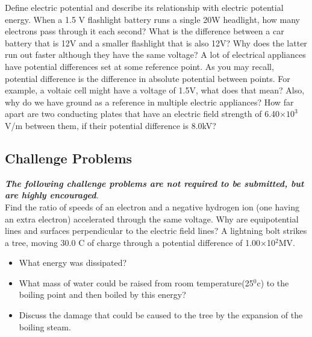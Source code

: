 \documentclass[9pt,addpoints]{exam}
\begin{document}
	\begin{questions}
		\question Define electric potential and describe its relationship with electric potential energy.
		\question When a 1.5 V flashlight battery runs a single 20W headlight, how many electrons pass through it each second?
		\question What is the difference between a car battery that is 12V and a smaller flashlight that is also 12V? Why does the latter run out faster although they have the same voltage?
		\question A lot of electrical appliances have potential differences set at some reference point. As you may recall, potential difference is the difference in absolute potential between points. For example, a voltaic cell might have a voltage of 1.5V, what does that mean? Also, why do we have ground as a reference in multiple electric appliances?
		\question How far apart are two conducting plates that have an electric field strength of  6.40×$10^3$V/m  between them, if their potential difference is 8.0kV?		
		\subsection*{Challenge Problems}
		\textit{\textbf{The following challenge problems are not required to be submitted, but are highly encouraged}.} \\
		\question Find the ratio of speeds of an electron and a negative hydrogen ion (one having an extra electron) accelerated through the same voltage.
		\question Why are equipotential lines and surfaces perpendicular to the electric field lines?
		\question A lightning bolt strikes a tree, moving 30.0 C of charge through a potential difference of 1.00×10$^2$MV.\begin{itemize}
			\item What energy was dissipated?
			\item  What mass of water could be raised from  room temperature(25$^0$c) to the boiling point and then boiled by this energy?
			\item Discuss the damage that could be caused to the tree by the expansion of the boiling steam.
		\end{itemize} 
	\end{questions}		
\end{document}
